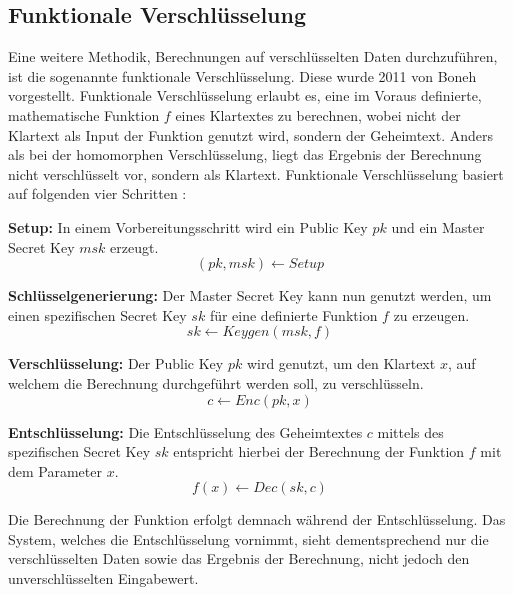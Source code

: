 \subsection{Funktionale Verschlüsselung}\label{sec:funktionale_verschlüsselung}

Eine weitere Methodik, Berechnungen auf verschlüsselten Daten durchzuführen, ist die sogenannte funktionale Verschlüsselung.
Diese wurde 2011 von Boneh \etal \cite{P-44} vorgestellt.
Funktionale Verschlüsselung erlaubt es, eine im Voraus definierte, mathematische Funktion $f$ eines Klartextes zu berechnen, wobei nicht der Klartext als Input der Funktion genutzt wird, sondern der Geheimtext. 
Anders als bei der homomorphen Verschlüsselung, liegt das Ergebnis der Berechnung nicht verschlüsselt vor, sondern als Klartext.
Funktionale Verschlüsselung basiert auf folgenden vier Schritten \cite{P-44}:
\begin{compactenum}
    \item \textbf{Setup: } In einem Vorbereitungsschritt wird ein Public Key $pk$ und ein Master Secret Key $msk$ erzeugt.
    \begin{equation*}
        (pk, msk) \xleftarrow{} Setup
    \end{equation*}
    \item \textbf{Schlüsselgenerierung: } Der Master Secret Key kann nun genutzt werden, um einen spezifischen Secret Key $sk$ für eine definierte Funktion $f$ zu erzeugen.
    \begin{equation*}
        sk \xleftarrow{} Keygen(msk, f)
    \end{equation*}
    \item \textbf{Verschlüsselung: } Der Public Key $pk$ wird genutzt, um den Klartext $x$, auf welchem die Berechnung durchgeführt werden soll, zu verschlüsseln.
    \begin{equation*}
        c \xleftarrow{} Enc(pk,x)
    \end{equation*}
    \item \textbf{Entschlüsselung: } Die Entschlüsselung des Geheimtextes $c$ mittels des spezifischen Secret Key $sk$ entspricht hierbei der Berechnung der Funktion $f$ mit dem Parameter $x$.
    \begin{equation*}
        f(x) \xleftarrow{} Dec(sk,c)
    \end{equation*}
\end{compactenum}

Die Berechnung der Funktion erfolgt demnach während der Entschlüsselung.
Das System, welches die Entschlüsselung vornimmt, sieht dementsprechend nur die verschlüsselten Daten sowie das Ergebnis der Berechnung, nicht jedoch den unverschlüsselten Eingabewert.

